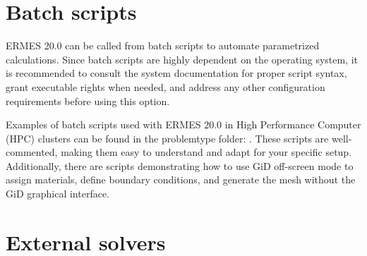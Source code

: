 \section{Batch scripts}

ERMES 20.0 can be called from batch scripts to automate parametrized calculations. Since batch scripts are highly dependent on the operating system, it is recommended to consult the system documentation for proper script syntax, grant executable rights when needed, and address any other configuration requirements before using this option.

Examples of batch scripts used with ERMES 20.0 in High Performance Computer (HPC) clusters can be found in the problemtype folder: . These scripts are well-commented, making them easy to understand and adapt for your specific setup. Additionally, there are scripts demonstrating how to use GiD off-screen mode to assign materials, define boundary conditions, and generate the mesh without the GiD graphical interface. 

\section{External solvers}\label{ExternalSolversInfo}

